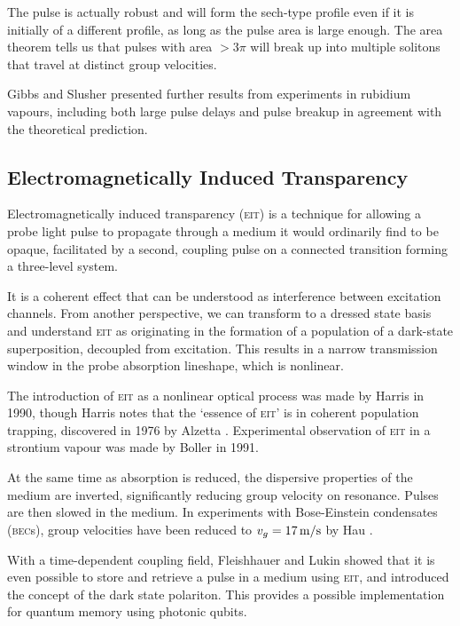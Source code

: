     The pulse is actually robust and will form the sech-type profile even if it
    is initially of a different profile, as long as the pulse area is large
    enough. The area theorem\cite{McCall1969} tells us that pulses with area $>
    3\pi$ will break up into multiple solitons that travel at distinct group
    velocities.

    Gibbs and Slusher presented further results from experiments in rubidium
    vapours,\cite{Slusher1972} including both large pulse delays and pulse
    breakup in agreement with the theoretical prediction.

  \subsection*{Electromagnetically Induced Transparency}

    Electromagnetically induced transparency (\textsc{eit}) is a technique for
    allowing a probe light pulse to propagate through a medium it would
    ordinarily find to be opaque, facilitated by a second, coupling pulse on a
    connected transition forming a three-level system.


    It is a coherent effect that can be understood as interference between
    excitation channels. From another perspective, we can transform to a
    dressed state basis and understand \textsc{eit} as originating in the
    formation of a population of a dark-state superposition, decoupled from
    excitation. This results in a narrow transmission window in the probe
    absorption lineshape, which is nonlinear.

    The introduction of \textsc{eit} as a nonlinear optical process was made by
    Harris \etal in 1990\cite{Harris1990}, though Harris notes\cite{Harris1997}
    that the `essence of \textsc{eit}' is in coherent population trapping,
    discovered in 1976 by Alzetta \etal\cite{Alzetta1976}. Experimental
    observation of \textsc{eit} in a strontium vapour was made by Boller
    \etal\cite{Boller1991} in 1991.

    At the same time as absorption is reduced, the dispersive properties of the
    medium are inverted, significantly reducing group velocity on resonance.
    Pulses are then slowed in the medium. In experiments with Bose-Einstein
    condensates (\textsc{bec}s), group velocities have been reduced to $v_g =
    \unit[17]{m/s}$ by Hau \etal\cite{Hau1999}.

    With a time-dependent coupling field, Fleishhauer and Lukin showed that it
    is even possible to store and retrieve a pulse in a medium using
    \textsc{eit}, and introduced the concept of the dark state
    polariton\cite{Fleischhauer2000}. This provides a possible implementation
    for quantum memory using photonic qubits\cite{Lvovsky2009}.

  

  